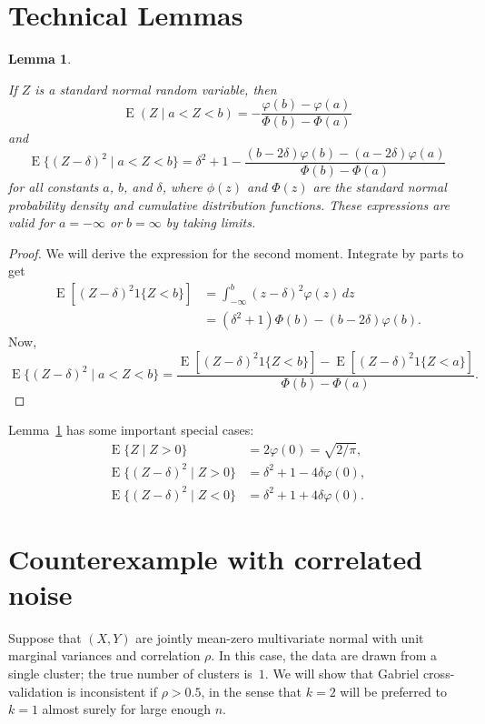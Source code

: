 \documentclass[11pt]{article}
\newtheorem{lemma}{Lemma}
\newcommand{\E}{\operatorname{E}}
\begin{document}
\section{Technical Lemmas}

\begin{lemma}\label{lem:truncated-normal-moments}

If $Z$ is a standard normal random variable, then
\[
  \E(Z \mid a < Z < b)
    = - \frac{\varphi(b) - \varphi(a)}
             {\Phi(b) - \Phi(a)}
\]
and
\[
  \E\{(Z - \delta)^2 \mid a < Z < b\}
    = \delta^2 + 1
    - \frac{  (b - 2 \delta) \varphi(b)
            - (a - 2 \delta) \varphi(a)}
           {\Phi(b) - \Phi(a)}
\]
for all constants $a$, $b$, and $\delta$, where
$\phi(z)$ and $\Phi(z)$ are the standard normal probability density and
cumulative distribution functions.  These expressions are valid
for $a = -\infty$ or $b = \infty$ by taking limits.

\end{lemma}
\begin{proof}
We will derive the expression for the second moment.
Integrate by parts to get
\begin{align*}
  \E[ (Z - \delta)^2 1\{Z < b\}]
    &= \int_{-\infty}^b (z - \delta)^2 \varphi(z) \, dz \\
    &= (\delta^2 + 1) \Phi(b) - (b - 2 \delta) \varphi(b).
\end{align*}
Now,
\[
  \E\{(Z - \delta)^2 \mid a < Z < b\}
    =
    \frac{  \E[ (Z - \delta)^2 1\{Z < b\}]
          - \E[ (Z - \delta)^2 1\{Z < a\}]}
         { \Phi(b) - \Phi(a) }.
\]
\end{proof}

Lemma~\ref{lem:truncated-normal-moments} has some important special cases:
\begin{align*}
  \E\{Z \mid Z > 0\} &= 2 \varphi(0) = \sqrt{2 / \pi}, \\
  \E\{(Z - \delta)^2 \mid Z > 0 \}
    &= \delta^2 + 1 - 4 \delta \varphi(0), \\
  \E\{(Z - \delta)^2 \mid Z < 0 \}
    &= \delta^2 + 1 + 4 \delta \varphi(0).
\end{align*}

\section{Counterexample with correlated noise}

Suppose that $(X, Y)$ are jointly mean-zero multivariate normal with unit
marginal variances and correlation $\rho$.  In this case, the data are drawn
from a single cluster; the true number of clusters is~$1$.  We will show that
Gabriel cross-validation is inconsistent if $\rho > 0.5$, in the sense that
$k = 2$ will be preferred to $k = 1$ almost surely for large enough $n$.
\end{document}
